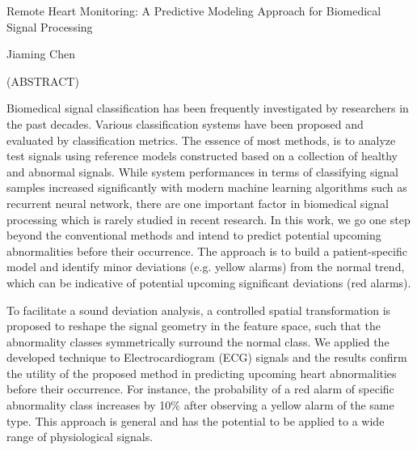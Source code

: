 
\begin{center}

\vfill

{\large Remote Heart Monitoring: A Predictive Modeling Approach for Biomedical Signal Processing }


Jiaming Chen

{(ABSTRACT)}




\vfill

\end{center}
Biomedical signal classification has been frequently investigated by researchers in the past decades. Various classification systems have been proposed and evaluated by classification metrics. The essence of most methods, is to analyze test signals using reference models constructed based on a collection of healthy and abnormal signals. While system performances in terms of classifying signal samples increased significantly with modern machine learning algorithms such as recurrent neural network, there are one important factor in biomedical signal processing which is rarely studied in recent research.  In this work, we go one step beyond the conventional methods and intend to predict potential upcoming abnormalities before their occurrence. The approach is to build a patient-specific model and identify minor deviations (e.g. yellow alarms) from the normal trend, which can be indicative of potential upcoming significant deviations (red alarms). 

To facilitate a sound deviation analysis, a controlled spatial transformation is proposed to reshape the signal geometry in the feature space, such that the abnormality classes symmetrically surround the normal class. We applied the developed technique to Electrocardiogram (ECG) signals and the results confirm the utility of the proposed method in predicting upcoming heart abnormalities before their occurrence. For instance, the probability of a red alarm of specific abnormality class increases by 10\% after observing a yellow alarm of the same type. This approach is general and has the potential to be applied to a wide range of physiological signals.


